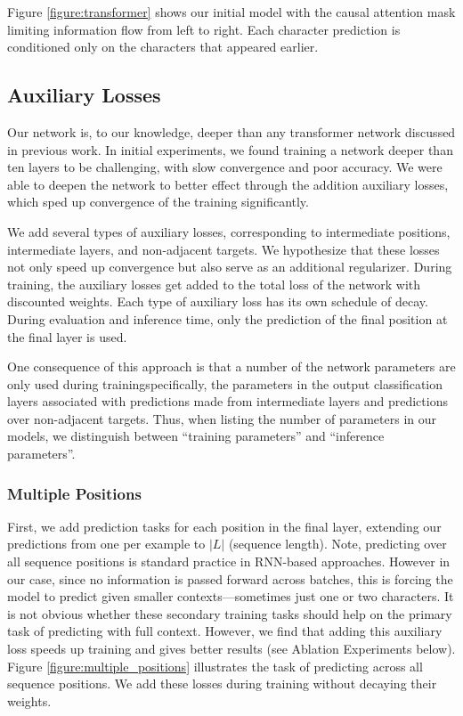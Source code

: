 Figure \ref{figure:transformer} shows our initial model with the causal attention mask limiting information flow from left to right. Each character prediction is conditioned only on the characters that appeared earlier.

\subsection{Auxiliary Losses}
\label{section:aux}
Our network is, to our knowledge, deeper than any transformer network discussed in previous work. In initial experiments, we found training a network deeper than ten layers to be challenging, with slow convergence and poor accuracy. We were able to deepen the network to better effect through the addition auxiliary losses, which sped up convergence of the training significantly.

We add several types of auxiliary losses, corresponding to intermediate positions, intermediate layers, and non-adjacent targets. We hypothesize that these losses not only speed up convergence but also serve as an additional regularizer. During training, the auxiliary losses get added to the total loss of the network with discounted weights. Each type of auxiliary loss has its own schedule of decay. During evaluation and inference time, only the prediction of the final position at the final layer is used.

One consequence of this approach is that a number of the network parameters are only used during training\textemdash specifically, the parameters in the output classification layers associated with predictions made from intermediate layers and predictions over non-adjacent targets. Thus, when listing the number of parameters in our models, we distinguish between ``training parameters'' and ``inference parameters''.

\subsubsection{Multiple Positions}

First, we add prediction tasks for each position in the final layer, extending our predictions from one per example to $|L|$ (sequence length). Note, predicting over all sequence positions is standard practice in RNN-based approaches. However in our case, since no information is passed forward across batches, this is forcing the model to predict given smaller contexts---sometimes just one or two characters. It is not obvious whether these secondary training tasks should help on the primary task of predicting with full context. However, we find that adding this auxiliary loss speeds up training and gives better results (see Ablation Experiments below). Figure \ref{figure:multiple_positions} illustrates the task of predicting across all sequence positions. We add these losses during training without decaying their weights.

